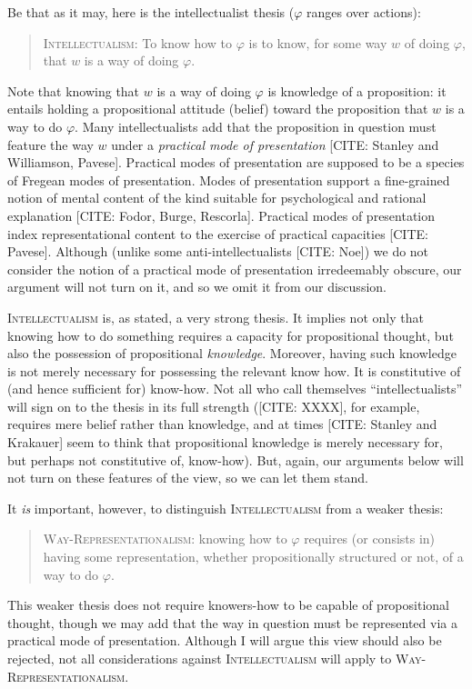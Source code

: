Be that as it may, here is the intellectualist thesis ($\varphi$ ranges over actions):
\begin{quote}
	\textsc{Intellectualism:} To know how to $\varphi$ is to know, for some way $w$ of doing $\varphi$, that $w$ is a way of doing $\varphi$.
\end{quote}
Note that knowing that $w$ is a way of doing $\varphi$ is knowledge of a proposition: it entails holding a propositional attitude (belief) toward the proposition that $w$ is a way to do $\varphi$.
Many intellectualists add that the proposition in question must feature the way $w$ under a \emph{practical mode of presentation} [CITE: Stanley and Williamson, Pavese].
Practical modes of presentation are supposed to be a species of Fregean modes of presentation.
Modes of presentation support a fine-grained notion of mental content of the kind suitable for psychological and rational explanation [CITE: Fodor, Burge, Rescorla].
Practical modes of presentation index representational content to the exercise of practical capacities [CITE: Pavese].
Although (unlike some anti-intellectualists [CITE: Noe]) we do not consider the notion of a practical mode of presentation irredeemably obscure, our argument will not turn on it, and so we omit it from our discussion.

\textsc{Intellectualism} is, as stated, a very strong thesis.
It implies not only that knowing how to do something requires a capacity for propositional thought, but also the possession of propositional \emph{knowledge}.
Moreover, having such knowledge is not merely necessary for possessing the relevant know how.
It is constitutive of (and hence sufficient for) know-how.
Not all who call themselves ``intellectualists'' will sign on to the thesis in its full strength ([CITE: XXXX], for example, requires mere belief rather than knowledge, and at times [CITE: Stanley and Krakauer] seem to think that propositional knowledge is merely necessary for, but perhaps not constitutive of, know-how).
But, again, our arguments below will not turn on these features of the view, so we can let them stand.

It \emph{is} important, however, to distinguish \textsc{Intellectualism} from a weaker thesis: 
\begin{quote}
	\textsc{Way-Representationalism:} knowing how to $\varphi$ requires (or consists in) having some representation, whether propositionally structured or not, of a way to do $\varphi$.
\end{quote}
This weaker thesis does not require knowers-how to be capable of propositional thought, though we may add that the way in question must be represented via a practical mode of presentation.
Although I will argue this view should also be rejected, not all considerations against \textsc{Intellectualism} will apply to \textsc{Way-Representationalism}.

